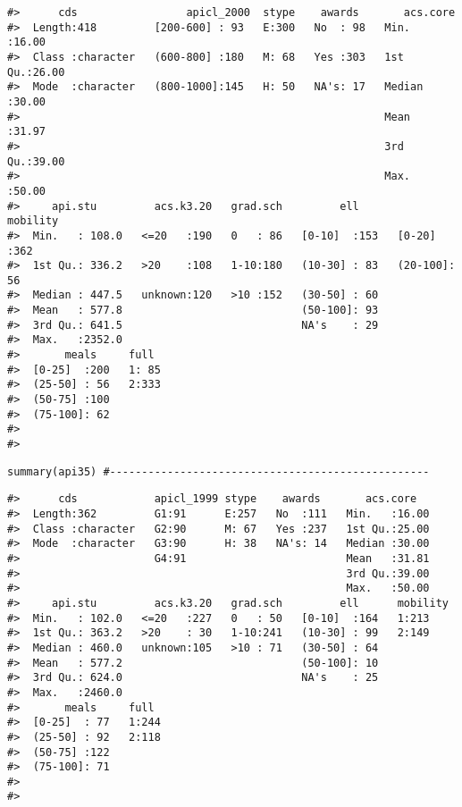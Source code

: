 \begin{verbatim}
#>      cds                 apicl_2000  stype    awards       acs.core    
#>  Length:418         [200-600] : 93   E:300   No  : 98   Min.   :16.00  
#>  Class :character   (600-800] :180   M: 68   Yes :303   1st Qu.:26.00  
#>  Mode  :character   (800-1000]:145   H: 50   NA's: 17   Median :30.00  
#>                                                         Mean   :31.97  
#>                                                         3rd Qu.:39.00  
#>                                                         Max.   :50.00  
#>     api.stu         acs.k3.20   grad.sch         ell          mobility  
#>  Min.   : 108.0   <=20   :190   0   : 86   [0-10]  :153   [0-20]  :362  
#>  1st Qu.: 336.2   >20    :108   1-10:180   (10-30] : 83   (20-100]: 56  
#>  Median : 447.5   unknown:120   >10 :152   (30-50] : 60                 
#>  Mean   : 577.8                            (50-100]: 93                 
#>  3rd Qu.: 641.5                            NA's    : 29                 
#>  Max.   :2352.0                                                         
#>       meals     full   
#>  [0-25]  :200   1: 85  
#>  (25-50] : 56   2:333  
#>  (50-75] :100          
#>  (75-100]: 62          
#>                        
#> 
\end{verbatim}

\begin{verbatim}
summary(api35) #--------------------------------------------------
\end{verbatim}

\begin{verbatim}
#>      cds            apicl_1999 stype    awards       acs.core    
#>  Length:362         G1:91      E:257   No  :111   Min.   :16.00  
#>  Class :character   G2:90      M: 67   Yes :237   1st Qu.:25.00  
#>  Mode  :character   G3:90      H: 38   NA's: 14   Median :30.00  
#>                     G4:91                         Mean   :31.81  
#>                                                   3rd Qu.:39.00  
#>                                                   Max.   :50.00  
#>     api.stu         acs.k3.20   grad.sch         ell      mobility
#>  Min.   : 102.0   <=20   :227   0   : 50   [0-10]  :164   1:213   
#>  1st Qu.: 363.2   >20    : 30   1-10:241   (10-30] : 99   2:149   
#>  Median : 460.0   unknown:105   >10 : 71   (30-50] : 64           
#>  Mean   : 577.2                            (50-100]: 10           
#>  3rd Qu.: 624.0                            NA's    : 25           
#>  Max.   :2460.0                                                   
#>       meals     full   
#>  [0-25]  : 77   1:244  
#>  (25-50] : 92   2:118  
#>  (50-75] :122          
#>  (75-100]: 71          
#>                        
#> 
\end{verbatim}

